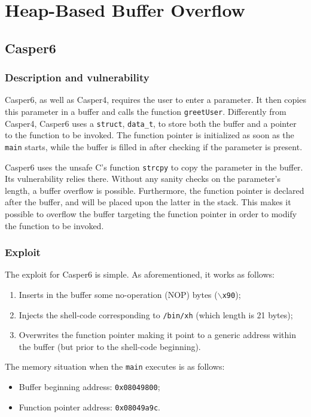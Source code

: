 \section{Heap-Based Buffer Overflow}
\subsection{Casper6}
\subsubsection{Description and vulnerability}
Casper6, as well as Casper4, requires the user to enter a parameter. It then copies this parameter in a buffer and calls the function \texttt{greetUser}. Differently from Casper4, Casper6 uses a \texttt{struct}, \texttt{data\_t}, to store both the buffer and a pointer to the function to be invoked. The function pointer is initialized as soon as the \texttt{main} starts, while the buffer is filled in after checking if the parameter is present. 

Casper6 uses the unsafe C's function \texttt{strcpy} to copy the parameter in the buffer. Its vulnerability relies there. Without any sanity checks on the parameter's length, a buffer overflow is possible. Furthermore, the function pointer is declared after the buffer, and will be placed upon the latter in the stack. This makes it possible to overflow the buffer targeting the function pointer in order to modify the function to be invoked.

\subsubsection{Exploit}
The exploit for Casper6 is simple. As aforementioned, it works as follows:
\begin{enumerate}
	\item Inserts in the buffer some no-operation (NOP) bytes (\texttt{$\backslash$x90});
	\item Injects the shell-code corresponding to \texttt{/bin/xh} (which length is 21 bytes);
	\item Overwrites the function pointer making it point to a generic address within the buffer (but prior to the shell-code beginning).
\end{enumerate}

The memory situation when the \texttt{main} executes is as follows:
\begin{itemize}
	\item Buffer beginning address: \texttt{0x08049800};
	\item Function pointer address: \texttt{0x08049a9c}.
\end{itemize}

